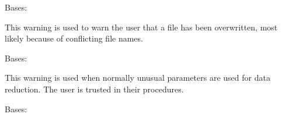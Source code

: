 \documentclass[letterpaper,10pt,english]{sphinxmanual}
\begin{document}

\begin{fulllineitems}
\label{\detokenize{python_docstrings/IfA_Smeargle.meta.errors:IfA_Smeargle.meta.errors.OverwriteWarning}}
Bases: {\hyperref[\detokenize{python_docstrings/IfA_Smeargle.meta.errors:IfA_Smeargle.meta.errors.Smeargle_Warning}]{}}

This warning is used to warn the user that a file has been overwritten,
most likely because of conflicting file names.

\end{fulllineitems}


\begin{fulllineitems}
\label{\detokenize{python_docstrings/IfA_Smeargle.meta.errors:IfA_Smeargle.meta.errors.ReductionWarning}}
Bases: {\hyperref[\detokenize{python_docstrings/IfA_Smeargle.meta.errors:IfA_Smeargle.meta.errors.Smeargle_Warning}]{}}

This warning is used when normally unusual parameters are used for data
reduction. The user is trusted in their procedures.

\end{fulllineitems}


\begin{fulllineitems}
\label{\detokenize{python_docstrings/IfA_Smeargle.meta.errors:IfA_Smeargle.meta.errors.Smeargle_BaseException}}
Bases: 

\end{fulllineitems}

\end{document}
